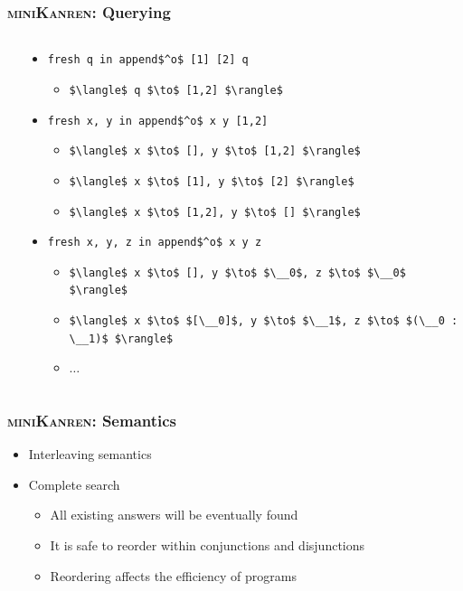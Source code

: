 \documentclass[xcolor=table]{beamer}
\newcommand{\mk}{\textsc{miniKanren}\xspace}
\begin{document}
\begin{frame}[fragile]
  \frametitle{\mk: Querying}
  \begin{columns}
    \begin{column}{0.4\textwidth}
      \begin{center}
        
      \end{center}
    \end{column}
    \begin{column}{0.6\textwidth}
      \begin{itemize}
        \item \lstinline{fresh q in append$^o$ [1] [2] q}
        \begin{itemize}
          \setlength{\itemindent}{-0.6em}
          \item \lstinline{$\langle$ q $\to$ [1,2] $\rangle$}
        \end{itemize}
        \pause
        \item \lstinline{fresh x, y in append$^o$ x y [1,2]}
        \begin{itemize}
          \setlength{\itemindent}{-0.6em}
          \item \lstinline{$\langle$ x $\to$ [], y $\to$ [1,2] $\rangle$}
          \item \lstinline{$\langle$ x $\to$ [1], y $\to$ [2] $\rangle$}
          \item \lstinline{$\langle$ x $\to$ [1,2], y $\to$ [] $\rangle$}
        \end{itemize}
        \pause
        \item \lstinline{fresh x, y, z in append$^o$ x y z}
        \begin{itemize}
          \setlength{\itemindent}{-0.6em}
          \item \lstinline{$\langle$ x $\to$ [], y $\to$ $\__0$, z $\to$ $\__0$ $\rangle$}
          \item \lstinline{$\langle$ x $\to$ $[\__0]$, y $\to$ $\__1$, z $\to$ $(\__0 : \__1)$ $\rangle$}
          \item $\dots$
        \end{itemize}
      \end{itemize}
    \end{column}
  \end{columns}

\end{frame}

\begin{frame}[fragile]
  \frametitle{\mk: Semantics}
  \begin{itemize}
    \item Interleaving semantics
    \item Complete search
    \begin{itemize}
      \item All existing answers will be eventually found
      \item It is safe to reorder within conjunctions and disjunctions
      \item Reordering affects the efficiency of programs
    \end{itemize}
  \end{itemize}
\end{frame}
\end{document}
